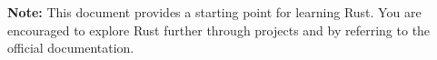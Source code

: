 \documentclass[a4paper,12pt]{report}
\begin{document}
	
\vspace{1cm}	
	
	
	
\noindent \textcolor{rustorange}{\textbf{Note:}} 
This document provides a starting point for learning Rust. You are encouraged to explore Rust further through projects and by referring to the official documentation.

	

	
	
	
	
	

	
	
	
	
	
	
	
	
	
	
\end{document}
